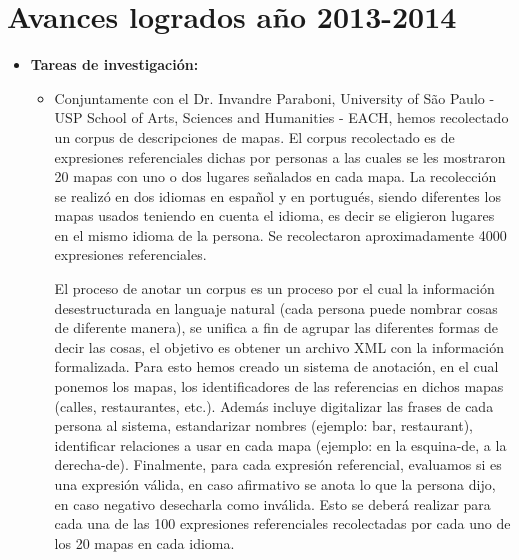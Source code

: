 \section{Avances logrados a\~no 2013-2014 }
\label{progreso}

\begin{itemize}
\item \textbf{Tareas de investigaci\'on:}
\begin{itemize}

\item Conjuntamente con el Dr. Invandre Paraboni, University of S\~ao Paulo - USP 
School of Arts, Sciences and Humanities - EACH, hemos recolectado un corpus de descripciones de mapas. El corpus recolectado es de expresiones referenciales dichas por personas a las cuales se les mostraron 20 mapas con uno o dos lugares se\~nalados en cada mapa. La recolecci\'on se realiz\'o en dos idiomas en espa\~nol y en portugu\'es, siendo diferentes los mapas usados teniendo en cuenta el idioma, es decir se eligieron lugares en el mismo idioma de la persona. Se recolectaron aproximadamente 4000 expresiones referenciales. 

El proceso de anotar un corpus es un proceso por el cual la informaci\'on desestructurada en languaje natural (cada persona puede nombrar cosas de diferente manera), se unifica a fin de agrupar las diferentes formas de decir las cosas, el objetivo es obtener un archivo XML con la informaci\'on formalizada.
Para esto hemos creado un sistema de anotaci\'on, en el cual ponemos los mapas, los identificadores de las referencias en dichos mapas (calles, restaurantes, etc.). Adem\'as incluye digitalizar las frases de cada persona al sistema, estandarizar nombres (ejemplo: bar, restaurant), identificar relaciones a usar en cada mapa (ejemplo: en la esquina-de, a la derecha-de). Finalmente, para cada expresi\'on referencial, evaluamos si es una expresi\'on v\'alida, en caso afirmativo se anota lo que la persona dijo, en caso negativo desecharla como inv\'alida. Esto se deber\'a realizar para cada una de las 100 expresiones referenciales recolectadas por cada uno de los 20 mapas en cada idioma.
 

\end{itemize}
\end{itemize}

